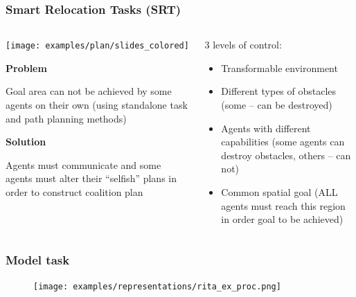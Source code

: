 \documentclass[default]{beamer}
\begin{document}
	\begin{frame}
		\frametitle{Smart Relocation Tasks (SRT)}
		
		\begin{columns}
			\begin{column}{0.55\textwidth}
				\begin{center}
					\texttt{[image: examples/plan/slides\_colored]}
				\end{center}
				
				\textbf{Problem}
				
				Goal area can not be achieved by some agents on their own (using standalone task and path planning methods)
				
				\textbf{Solution}
				
				Agents must communicate and some agents must alter their ``selfish'' plans in order to construct coalition plan
				
			\end{column}
			\begin{column}{0.45\textwidth}
				3 levels of control:
				\begin{itemize}
					\item Transformable environment
					\item Different types of obstacles (some -- can be destroyed)
					\item Agents with different capabilities (some agents can destroy obstacles, others -- can not)
					\item Common spatial goal (ALL agents must reach this region in order goal to be achieved)
				\end{itemize}
			\end{column}
		\end{columns}
	\end{frame}

	\begin{frame}
		\frametitle{Model task}
		
		\begin{figure}
			\texttt{[image: examples/representations/rita\_ex\_proc.png]}
		\end{figure}
	\end{frame}
\end{document}
